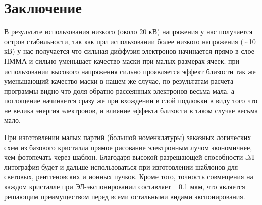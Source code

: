 \chapter*{Заключение}
В результате использования низкого (около 20 кВ) напряжения у нас получается остров стабильности,
так как при использовании более низкого напряжения (\(\sim\)10 кВ) у нас получается что сильная диффузия электронов начинается прямо в слое ПММА и сильно уменьшает качество маски при малых размерах ячеек.
при использовании высокого напряжения сильно проявляется эффект близости так же уменьшающий качество маски
в нашем же случае, по результатам расчета программы видно что доля обратно рассеянных электронов весьма мала, а поглощение начинается сразу же при вхождении в слой подложки в виду того что не велика энергия электронов, и влияние эффекта близости в таком случае весьма мало.


При изготовлении малых партий (большой номенклатуры) заказных логических схем из базового кристалла прямое рисование электронным лучом экономичнее, чем фотопечать через шаблон. Благодаря высокой разрешающей способности ЭЛ-литография будет и дальше использоваться при изготовлении шаблонов для световых, рентгеновских и ионных пучков. Кроме того, точность совмещения на каждом кристалле при ЭЛ-экспонировании составляет ±0.1 мкм, что является решающим преимуществом перед всеми остальными видами экспонирования.
